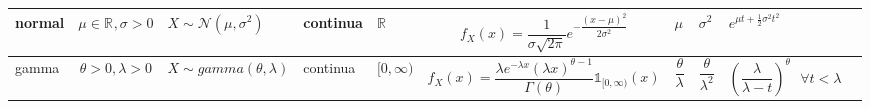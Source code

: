 \documentclass[letterpaper,10.5pt,twocolumn]{article} %
\newcommand{\R}[1][]{\mathbb{R}^{#1}}
\let\oldfrac=\frac
\renewcommand{\frac}[2]{\ensuremath{\oldfrac{#1}{#2}}}
\begin{document}
\begin{landscape}
\begin{table}[htbp]
\begin{tabular}{|M{5.0em}|c|M{8.0em}|M{3.5em}|M{5.5em}|c|M{4.0em}|M{5.0em}|M{8.0em}|N}
    \hline
    normal & \rule{0pt}{30pt}  $\mu \in \R, \sigma>0 $    & $X \sim \mathcal{N}(\mu,\sigma^2)$     & continua & $\R$     &   $f_{X}(x) = \dfrac{1}{\sigma \sqrt{2\pi}} e^{-\dfrac{(x-\mu)^2}{2\sigma^2}} $    & $\mu$    & $\sigma^2$ & $e^{\mu t + \frac{1}{2} \sigma^2 t^2}$ \bigstrut\\[25pt]
    \hline
    gamma &  \rule{0pt}{30pt}  $\theta >0, \lambda>0 $   & $X \sim gamma(\theta, \lambda)$     & continua & $[0,\infty)$ &   $f_{X}(x) = \dfrac{\lambda e^{-\lambda x} (\lambda x)^{\theta -1}}{\Gamma (\theta)} \mathds{1}_{[0,\infty)} (x) $    & $\dfrac{\theta}{\lambda}$ & $\dfrac{\theta}{\lambda^2}$ & $\left(\dfrac{\lambda}{\lambda - t}\right)^\theta \ \ \ \forall t<\lambda$   \bigstrut\\[30pt]
    \hline
    \end{tabular}%
  \label{tab:addlabel}%
\end{table}%




\end{landscape}
\restoregeometry
\end{document}
